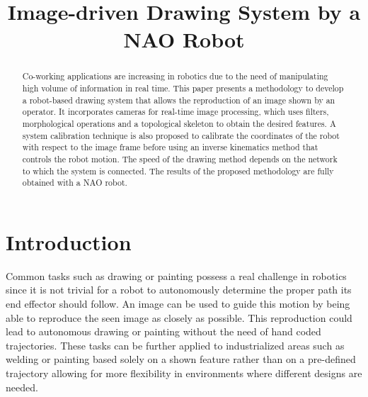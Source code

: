 \documentclass[conference]{IEEEtran}
\begin{document}
\title{Image-driven Drawing System by a NAO Robot}
\author{
}
\maketitle
\begin{abstract}
Co-working applications are increasing in robotics due to the need of manipulating high volume of information in real time. This paper presents a methodology to develop a robot-based drawing system that allows the reproduction of an image shown by an operator. It incorporates cameras for real-time image processing, which uses filters, morphological operations and a topological skeleton to obtain the desired features. A system calibration technique is also proposed to calibrate the coordinates of the robot with respect to the image frame before using an inverse kinematics method that controls the robot motion. The speed of the drawing method depends on the network to which the system is connected. The results of the proposed methodology are fully obtained with a NAO robot.
\end{abstract}
\IEEEpeerreviewmaketitle

\section{Introduction}

Common tasks such as drawing or painting possess a real challenge in robotics since it is not trivial for a robot to autonomously determine the proper path its end effector should follow. An image can be used to guide this motion by being able to reproduce the seen image as closely as possible. This reproduction could lead to autonomous drawing or painting without the need of hand coded trajectories. These tasks can be further applied to industrialized areas such as welding or painting based solely on a shown feature rather than on a pre-defined trajectory allowing for more flexibility in environments where different designs are needed.
\end{document}
